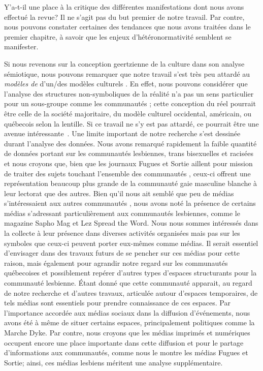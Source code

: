 Y'a-t-il une place à la critique des différentes manifestations dont nous avons effectué la revue?
Il ne s'agit pas du but premier de notre travail.
Par contre, nous pouvons constater certaines des tendances que nous avons traitées dans le premier chapitre, à savoir que les enjeux d'hétéronormativité semblent se manifester.

Si nous revenons sur la conception geertzienne de la culture dans son analyse sémiotique, nous pouvons remarquer que notre travail s'est très peu attardé au \emph{modèles de} d'un/des modèles culturels \lgbt{}.
En effet, nous pouvons considérer  que l'analyse des structures non-symboliques de la réalité n'a pas un sens particulier pour un sous-groupe comme les communautés \lgbt{}; cette conception du réel pourrait être celle de la société majoritaire, du modèle culturel occidental, américain, ou québecois selon la lentille.
Si ce travail ne s'y est pas attardé, ce pourrait être une avenue intéressante~.
Une limite important de notre recherche s'est dessinée durant l'analyse des données.
Nous avons remarqué rapidement la faible quantité de données portant sur les communautés lesbiennes, trans bisexuelles et racisées et nous croyons que, bien que les journaux Fugues et Sortie aillent pour mission de traiter des sujets touchant l'ensemble des communautés \lgbt{}, ceux-ci offrent une représentation beaucoup plus grande de la communauté gaie masculine blanche à leur lectorat que des autres.
Bien qu'il nous ait semblé que peu de médias s'intéressaient aux autres communautés \lgbt, nous avons noté la présence de certains médias s'adressant particulièrement aux communautés lesbiennes, comme le magazine Sapho Mag et Lez Spread the Word.
Nous nous sommes intéressés dans la collecte à leur présence dans diverses activités organisées mais pas sur les symboles que ceux-ci peuvent porter eux-mêmes comme médias.
Il serait essentiel d'envisager dans des travaux futurs de se pencher sur ces médias pour cette raison, mais également pour agrandir notre regard sur les communautés \lgbt québecoises et possiblement repérer d'autres types d'espaces structurants pour la communauté lesbienne.
Étant donné que cette communauté apparait, au regard de notre recherche et d'autres travaux, articulée autour d'espaces temporaires, de tels médias sont essentiels pour prendre connaissance de ces espaces.
Par l'importance accordée aux médias sociaux dans la diffusion d'événements, nous avons été à même de situer certains espaces, principalement politiques comme la Marche Dyke. 
Par contre, nous croyons que les médias imprimés et numériques occupent encore une place importante dans cette diffusion et pour le partage d'informations aux communautés, comme nous le montre les médias Fugues et Sortie; ainsi, ces médias lesbiens méritent une analyse supplémentaire.

